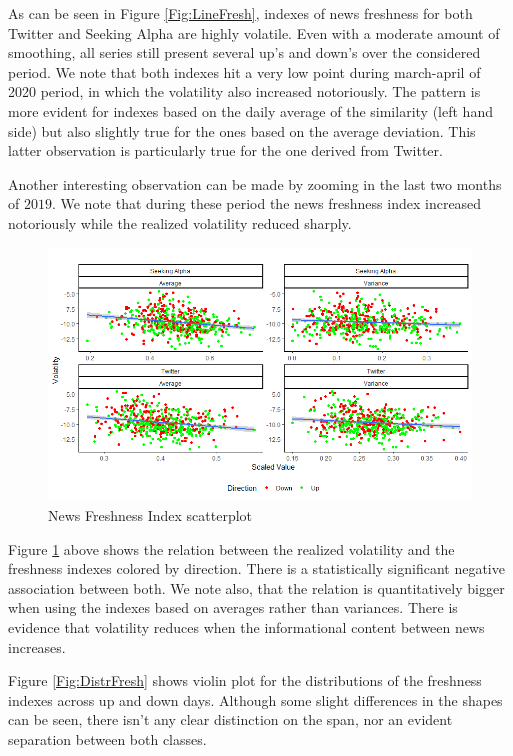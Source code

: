 \documentclass[a4paper, 12pt]{report}
\begin{document}
    As can be seen in Figure \ref{Fig:LineFresh}, indexes of news freshness for both Twitter and Seeking Alpha are highly volatile. Even with a moderate amount of smoothing, all series still present several up's and down's over the considered period. We note that both indexes hit a very low point during march-april of 2020 period, in which the volatility also increased notoriously. The pattern is more evident for indexes based on the daily average of the similarity (left hand side) but also slightly true for the ones based on the average deviation. This latter observation is particularly true for the one derived from Twitter.
    
    Another interesting observation can be made by zooming in the last two months of $2019$. We note that during these period the news freshness index increased notoriously while the realized volatility reduced sharply. 
    
    \begin{figure}[H]
    \centering
    \includegraphics[width=16cm]{graphs/500ScatterFresh.png}
    \caption{News Freshness Index scatterplot}
    \label{Fig:ScatterFresh}
    \end{figure}
    
    Figure \ref{Fig:ScatterFresh} above shows the relation between the realized volatility and the freshness indexes colored by direction. There is a statistically significant negative association between both. We note also, that the relation is quantitatively bigger when using the indexes based on averages rather than variances. There is evidence that volatility reduces when the informational content between news increases. 
    
    Figure \ref{Fig:DistrFresh} shows violin plot for the distributions of the freshness indexes across up and down days. Although some slight differences in the shapes can be seen, there isn't any clear distinction on the span, nor an evident separation between both classes.
    
\end{document}
